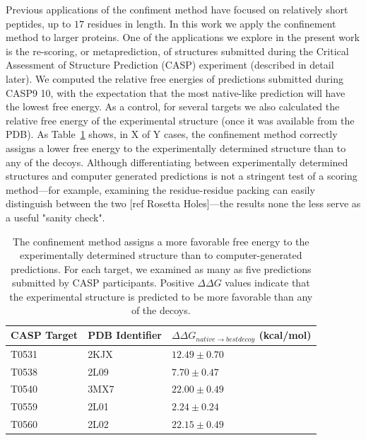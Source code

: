 \documentclass[12pt]{article}
\begin{document}
Previous applications of the confiment method have focused on relatively short peptides, up to $17$
residues in length. In this work we apply the confinement method to
larger proteins. One of the  applications we explore in the present work is the re-scoring, or
metaprediction, of structures submitted during the Critical Assessment of Structure Prediction
(CASP) experiment (described in detail later). We computed the relative free energies of predictions
submitted during CASP9 10, with the expectation that the most native-like prediction will have
the lowest free energy. As a control, for several targets we also calculated the relative free
energy of the experimental structure (once it was available from the PDB). As
Table~\ref{table:casp_control} shows, in X of Y cases, the confinement method correctly assigns a
lower free energy to the experimentally determined structure than to any of the decoys. Although
differentiating between experimentally determined structures and computer generated predictions is
not a stringent test of a scoring method---for example, examining the residue-residue packing can
easily distinguish between the two [ref Rosetta Holes]---the results none the less serve as a useful
"sanity check".

\begin{table}
\label{table:casp_control}

\begin{center}
\begin{tabular}{l l l}\hline
    CASP Target  & PDB Identifier & $\Delta\Delta G_{native \to best decoy}$ (kcal/mol) \\ \hline
     T0531       &    2KJX        &          $12.49 \pm 0.70$ \\ \hline
     T0538       &    2L09        &          $7.70 \pm 0.47$ \\ \hline
     T0540       &    3MX7        &          $22.00 \pm 0.49$ \\ \hline
     T0559       &    2L01        &          $2.24 \pm 0.24$ \\ \hline
     T0560       &    2L02        &          $22.15 \pm 0.49$ \\ \hline 
\end{tabular}
\end{center}

\caption{The confinement method assigns a more favorable free energy to the experimentally
determined structure than to computer-generated predictions. For each target, we examined as many as
five predictions submitted by CASP participants. Positive $\Delta\Delta G$ values indicate that the
experimental structure is predicted to be more favorable than any of the decoys.}

\end{table}
\end{document}
